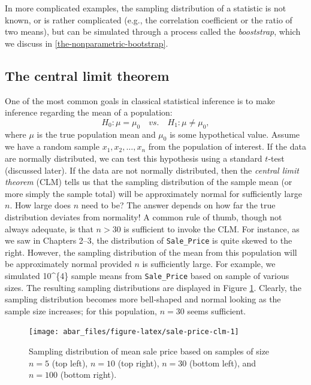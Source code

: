 \documentclass[]{book}
\theoremstyle{definition}
\theoremstyle{definition}
\theoremstyle{definition}
\theoremstyle{remark}
\begin{document}
In more complicated examples, the sampling distribution of a statistic
is not known, or is rather complicated (e.g., the correlation
coefficient or the ratio of two means), but can be simulated through a
process called the \emph{booststrap}, which we discuss in
\ref{the-nonparametric-bootstrap}.

\hypertarget{the-central-limit-theorem}{%
\subsection{The central limit theorem}\label{the-central-limit-theorem}}

One of the most common goals in classical statistical inference is to
make inference regarding the mean of a population: \[
  H_0: \mu = \mu_0 \quad vs. \quad H_1: \mu \ne \mu_0,
\] where \(\mu\) is the true population mean and \(\mu_0\) is some
hypothetical value. Assume we have a random sample
\(x_1, x_2, \dots, x_n\) from the population of interest. If the data
are normally distributed, we can test this hypothesis using a standard
\(t\)-test (discussed later). If the data are not normally distributed,
then the \emph{central limit theorem} (CLM) tells us that the sampling
distribution of the sample mean (or more simply the sample total) will
be approximately normal for sufficiently large \(n\). How large does
\(n\) need to be? The answer depends on how far the true distribution
deviates from normality! A common rule of thumb, though not always
adequate, is that \(n > 30\) is sufficient to invoke the CLM. For
instance, as we saw in Chapters 2--3, the distribution of
\texttt{Sale\_Price} is quite skewed to the right. However, the sampling
distribution of the mean from this population will be approximately
normal provided \(n\) is sufficiently large. For example, we simulated
10\^{}\{4\} sample means from \texttt{Sale\_Price} based on sample of
various sizes. The resulting sampling distributions are displayed in
Figure \ref{fig:sale-price-clm}. Clearly, the sampling distribution
becomes more bell-shaped and normal looking as the sample size
increases; for this population, \(n = 30\) seems sufficient.

\begin{figure}

{\centering \texttt{[image: abar\_files/figure-latex/sale-price-clm-1]} 

}

\caption{Sampling distribution of mean sale price based on samples of size $n = 5$ (top left), $n = 10$ (top right), $n = 30$ (bottom left), and $n = 100$ (bottom right).}\label{fig:sale-price-clm}
\end{figure}
\end{document}
